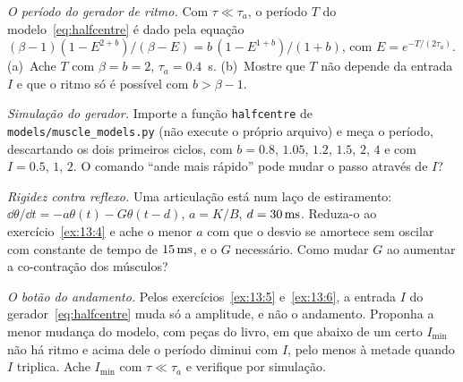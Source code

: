 \begin{exercise}[\lvlB]
\label{ex:13:5}
\emph{O período do gerador de ritmo.} Com $\tau\ll\tau_a$, o período $T$ do modelo~\eqref{eq:halfcentre} é dado pela equação $(\beta-1)(1-E^{2+b})/(\beta-E)=b\,(1-E^{1+b})/(1+b)$, com $E=e^{-T/(2\tau_a)}$. (a)~Ache $T$ com $\beta=b=2$, $\tau_a=0.4$~s. (b)~Mostre que $T$ não depende da entrada $I$ e que o ritmo só é possível com $b>\beta-1$.
\end{exercise}

\begin{exercise}[\lvlB]
\label{ex:13:6}
\emph{Simulação do gerador.} Importe a função \texttt{halfcentre} de \texttt{models/\allowbreak muscle\_models.py} (não execute o próprio arquivo) e meça o período, descartando os dois primeiros ciclos, com $b=0.8$, $1.05$, $1.2$, $1.5$, $2$, $4$ e com $I=0.5$, $1$, $2$. O comando ``ande mais rápido'' pode mudar o passo através de $I$?
\end{exercise}

\begin{exercise}[\lvlB]
\label{ex:13:7}
\emph{Rigidez contra reflexo.} Uma articulação está num laço de estiramento: $\dd\theta/\dd t=-a\theta(t)-G\theta(t-d)$, $a=K/B$, $d=30\,\text{ms}$. Reduza-o ao exercício~\ref{ex:13:4} e ache o menor $a$ com que o desvio se amortece sem oscilar com constante de tempo de $15\,\text{ms}$, e o $G$ necessário. Como mudar $G$ ao aumentar a co-contração dos músculos?
\end{exercise}

\begin{exercise}[\lvlC]
\label{ex:13:8}
\emph{O botão do andamento.} Pelos exercícios~\ref{ex:13:5} e~\ref{ex:13:6}, a entrada $I$ do gerador~\eqref{eq:halfcentre} muda só a amplitude, e não o andamento. Proponha a menor mudança do modelo, com peças do livro, em que abaixo de um certo $I_{\min}$ não há ritmo e acima dele o período diminui com $I$, pelo menos à metade quando $I$ triplica. Ache $I_{\min}$ com $\tau\ll\tau_a$ e verifique por simulação.
\end{exercise}
